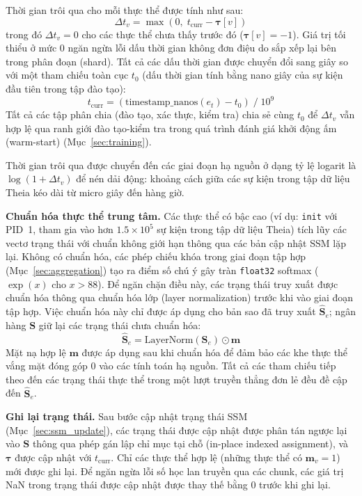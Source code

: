 \documentclass[letterpaper,twocolumn,10pt]{article}
\begin{document}
Thời gian trôi qua cho mỗi thực thể được tính như sau:
\begin{equation}
    \Delta t_v = \max\!\left(0,\; t_{\text{curr}} - \boldsymbol{\tau}[v]\right)
    \label{eq:dt}
\end{equation}
trong đó $\Delta t_v = 0$ cho các thực thể chưa thấy trước đó ($\boldsymbol{\tau}[v] = -1$). Giá trị tối thiểu ở mức 0 ngăn ngừa lỗi dấu thời gian không đơn điệu do sắp xếp lại bên trong phân đoạn (shard). Tất cả các dấu thời gian được chuyển đổi sang giây so với một tham chiếu toàn cục $t_0$ (dấu thời gian tính bằng nano giây của sự kiện đầu tiên trong tập đào tạo):
\begin{equation}
    t_{\text{curr}} = (\text{timestamp\_nanos}(e_t) - t_0) \;/\; 10^9
    \label{eq:t_curr}
\end{equation}
Tất cả các tập phân chia (đào tạo, xác thực, kiểm tra) chia sẻ cùng $t_0$ để $\Delta t_v$ vẫn hợp lệ qua ranh giới đào tạo-kiểm tra trong quá trình đánh giá khởi động ấm (warm-start) (Mục~\ref{sec:training}).

Thời gian trôi qua được chuyển đến các giai đoạn hạ nguồn ở dạng tỷ lệ logarit là $\log(1 + \Delta t_v)$ để nén dải động: khoảng cách giữa các sự kiện trong tập dữ liệu Theia kéo dài từ micro giây đến hàng giờ.

\textbf{Chuẩn hóa thực thể trung tâm.} Các thực thể có bậc cao (ví dụ: \texttt{init} với PID~1, tham gia vào hơn $1.5 \times 10^5$ sự kiện trong tập dữ liệu Theia) tích lũy các vectơ trạng thái với chuẩn không giới hạn thông qua các bản cập nhật SSM lặp lại. Không có chuẩn hóa, các phép chiếu khóa trong giai đoạn tập hợp (Mục~\ref{sec:aggregation}) tạo ra điểm số chú ý gây tràn \texttt{float32} softmax ($\exp(x)$ cho $x > 88$). Để ngăn chặn điều này, các trạng thái truy xuất được chuẩn hóa thông qua chuẩn hóa lớp (layer normalization) trước khi vào giai đoạn tập hợp. Việc chuẩn hóa này chỉ được áp dụng cho bản sao đã truy xuất $\hat{\mathbf{S}}_e$; ngân hàng $\mathbf{S}$ giữ lại các trạng thái chưa chuẩn hóa:
\begin{equation}
    \hat{\mathbf{S}}_e = \text{LayerNorm}(\mathbf{S}_e) \odot \mathbf{m}
    \label{eq:state_norm}
\end{equation}
Mặt nạ hợp lệ $\mathbf{m}$ được áp dụng sau khi chuẩn hóa để đảm bảo các khe thực thể vắng mặt đóng góp 0 vào các tính toán hạ nguồn. Tất cả các tham chiếu tiếp theo đến các trạng thái thực thể trong một lượt truyền thẳng đơn lẻ đều đề cập đến $\hat{\mathbf{S}}_e$.

\textbf{Ghi lại trạng thái.} Sau bước cập nhật trạng thái SSM (Mục~\ref{sec:ssm_update}), các trạng thái được cập nhật được phân tán ngược lại vào $\mathbf{S}$ thông qua phép gán lập chỉ mục tại chỗ (in-place indexed assignment), và $\boldsymbol{\tau}$ được cập nhật với $t_{\text{curr}}$. Chỉ các thực thể hợp lệ (những thực thể có $\mathbf{m}_v = 1$) mới được ghi lại. Để ngăn ngừa lỗi số học lan truyền qua các chunk, các giá trị NaN trong trạng thái được cập nhật được thay thế bằng 0 trước khi ghi lại.
\end{document}
